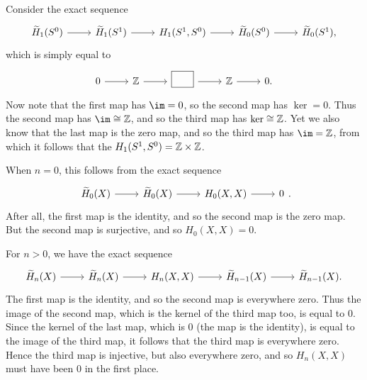 \documentclass[../../solutions.tex]{subfiles}
\begin{document}
\begin{exercise} \leavevmode
Consider the exact sequence 
\[\begin{tikzcd}
    \widetilde H_1(S^0)\ar[r] & \widetilde H_1(S^1)\ar[r] & H_1(S^1,S^0)\ar[r] & \widetilde H_0(S^0)\ar[r] & \widetilde H_0(S^1),
\end{tikzcd}\] 
which is simply equal to 
\[\begin{tikzcd}
    0\ar[r] & \ZZ\ar[r] & \boxed{\phantom{\widetilde HS}}\ar[r] & \ZZ\ar[r] & 0.
\end{tikzcd}\]
Now note that the first map has $\im=0$, so the second map has $\ker=0$. 
Thus the second map has $\im\cong\ZZ$, and so the third map has $\ker\cong\mathbb{Z}$. 
Yet we also know that the last map is the zero map, and so the third map has $\im=\ZZ$, from which it follows that the $H_1(S^1,S^0)=\mathbb{Z}\times\mathbb{Z}$. 
\end{exercise}

\begin{exercise} \leavevmode
When $n=0$, this follows from the exact sequence \[\begin{tikzcd}\widetilde H_0(X)\ar[r] & \widetilde H_0(X)\ar[r] & H_0(X,X)\ar[r] & 0\end{tikzcd}.\]
After all, the first map is the identity, and so the second map is the zero map. 
But the second map is surjective, and so $H_0(X,X)=0$. 

For $n>0$, we have the exact sequence 
\[\begin{tikzcd}
    \widetilde H_n(X)\ar[r] & \widetilde H_n(X)\ar[r] & H_n(X,X)\ar[r] & \widetilde H_{n-1}(X)\ar[r] & \widetilde H_{n-1}(X).
\end{tikzcd}\]
The first map is the identity, and so the second map is everywhere zero. 
Thus the image of the second map, which is the kernel of the third map too, is equal to 0.
Since the kernel of the last map, which is 0 (the map is the identity), is equal to the image of the third map, it follows that the third map is everywhere zero. 
Hence the third map is injective, but also everywhere zero, and so $H_n(X,X)$ must have been 0 in the first place. 
\end{exercise}
\end{document}
